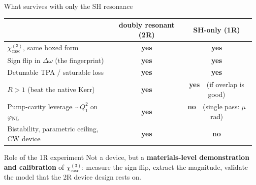 \documentclass[aspectratio=169,10pt]{beamer}
\newcommand{\chicasc}{\chi^{(3)}_{\mathrm{casc}}}
\newcommand{\Dom}{\Delta\omega}
\newcommand{\yes}{\textcolor{good}{\textbf{yes}}}
\newcommand{\no}{\textcolor{bad}{\textbf{no}}}
\begin{document}
\begin{frame}{What survives with only the SH resonance}
  \small
  \begin{table}
  \begin{tabular}{@{}lcc@{}}
    \toprule
     & doubly resonant (2R) & SH-only (1R) \\
    \midrule
    $\chicasc$, same boxed form & \yes & \yes \\
    Sign flip in $\Dom$ (the fingerprint) & \yes & \yes \\
    Detunable TPA / saturable loss & \yes & \yes \\
    $R>1$ (beat the native Kerr) & \yes & \yes\ \ (if overlap is good) \\
    Pump-cavity leverage $\sim Q_1^2$ on $\varphi_{\rm NL}$ & \yes & \no\ \ (single pass: $\mu$rad) \\
    Bistability, parametric ceiling, CW device & \yes & \no \\
    \bottomrule
  \end{tabular}
  \end{table}
  \vspace{4pt}
  \begin{alertblock}{Role of the 1R experiment}
    Not a device, but a \textbf{materials-level demonstration and calibration} of
    $\chicasc$: measure the sign flip, extract the magnitude, validate the model that
    the 2R device design rests on.
  \end{alertblock}
\end{frame}
\end{document}
